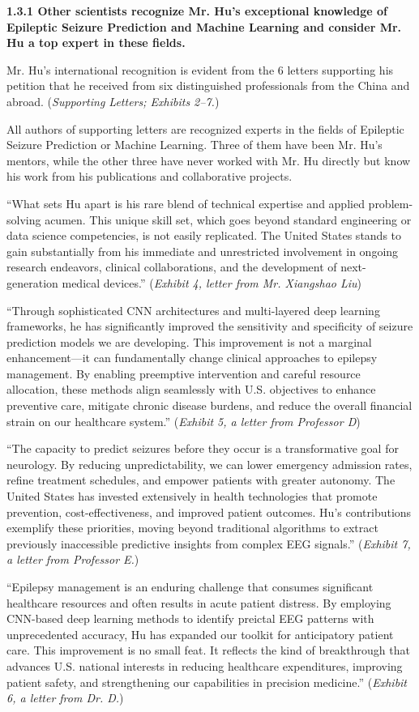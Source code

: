 \documentclass{article}
\begin{document}
{\bf 1.3.1 Other scientists recognize Mr. Hu’s exceptional knowledge of Epileptic Seizure Prediction and Machine Learning and consider Mr. Hu a top expert in these fields.}

Mr. Hu's international recognition is evident from the 6 letters supporting his petition that he received from six distinguished professionals from the China and abroad. ({\it Supporting Letters; Exhibits 2–7.}) 

All authors of supporting letters are recognized experts in the fields of Epileptic Seizure Prediction or Machine Learning. Three of them have been Mr. Hu’s mentors, while the other three have never worked with Mr. Hu directly but know his work from his publications and collaborative projects. 

“What sets Hu apart is his rare blend of technical expertise and applied problem-solving acumen. This unique skill set, which goes beyond standard engineering or data science competencies, is not easily replicated. The United States stands to gain substantially from his immediate and unrestricted involvement in ongoing research endeavors, clinical collaborations, and the development of next-generation medical devices.” ({\it Exhibit 4, letter from Mr. Xiangshao Liu})

“Through sophisticated CNN architectures and multi-layered deep learning frameworks, he has significantly improved the sensitivity and specificity of seizure prediction models we are developing. This improvement is not a marginal enhancement—it can fundamentally change clinical approaches to epilepsy management. By enabling preemptive intervention and careful resource allocation, these methods align seamlessly with U.S. objectives to enhance preventive care, mitigate chronic disease burdens, and reduce the overall financial strain on our healthcare system.” ({\it Exhibit 5, a letter from Professor D})

“The capacity to predict seizures before they occur is a transformative goal for neurology. By reducing unpredictability, we can lower emergency admission rates, refine treatment schedules, and empower patients with greater autonomy. The United States has invested extensively in health technologies that promote prevention, cost-effectiveness, and improved patient outcomes. Hu’s contributions exemplify these priorities, moving beyond traditional algorithms to extract previously inaccessible predictive insights from complex EEG signals.” ({\it Exhibit 7, a letter from Professor E.})

“Epilepsy management is an enduring challenge that consumes significant healthcare resources and often results in acute patient distress. By employing CNN-based deep learning methods to identify preictal EEG patterns with unprecedented accuracy, Hu has expanded our toolkit for anticipatory patient care. This improvement is no small feat. It reflects the kind of breakthrough that advances U.S. national interests in reducing healthcare expenditures, improving patient safety, and strengthening our capabilities in precision medicine.” ({\it Exhibit 6, a letter from Dr. D.})
\end{document}
